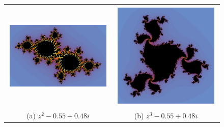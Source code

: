 \begin{figure}[ht]
  \centering
  \begin{tabular}{cc}
    \includegraphics[scale=0.5]{./img/C3/julia-generalizado-2.png} &   \includegraphics[scale=0.37]{./img/C3/julia-generalizado-3.png} \\
  (a) $z^2-0.55+0.48i$ & (b) $z^3-0.55+0.48i$ \\[6pt]

\end{tabular}
\end{figure}
